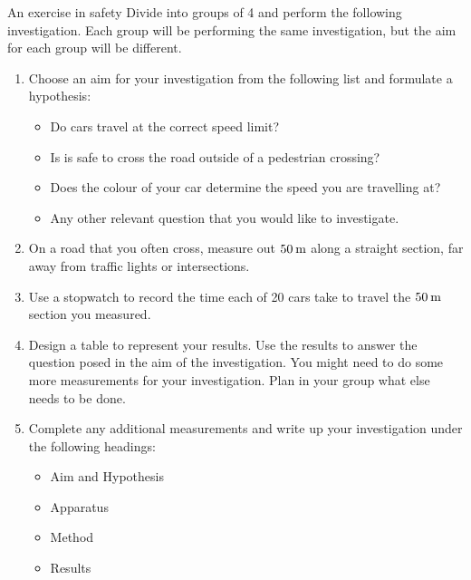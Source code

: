 \begin{Investigation}{An exercise in safety }
            \nopagebreak
        \label{m38791*id67213}Divide into groups of 4 and perform the following investigation. Each group will be performing the same investigation, but the aim for each group will be different.\par 
        \label{m38791*id67220}\begin{enumerate}[noitemsep, label=\textbf{\arabic*}. ] 
            \label{m38791*uid57}\item Choose an aim for your investigation from the following list and formulate a hypothesis:
\label{m38791*id67236}\begin{itemize}[noitemsep]
            \label{m38791*uid58}\item Do cars travel at the correct speed limit?
\label{m38791*uid59}\item Is is safe to cross the road outside of a pedestrian crossing?
\label{m38791*uid60}\item Does the colour of your car determine the speed you are travelling at?
\label{m38791*uid61}\item Any other relevant question that you would like to investigate.
\end{itemize}
        \label{m38791*uid62}\item On a road that you often cross, measure out $50\phantom{\rule{2pt}{0ex}}\text{m}$ along a straight section, far away from traffic lights or intersections.
\label{m38791*uid63}\item Use a stopwatch to record the time each of 20 cars take to travel the $50\phantom{\rule{2pt}{0ex}}\text{m}$ section you measured.
\label{m38791*uid64}\item Design a table to represent your results. Use the results to answer the question posed in the aim of the investigation. You might need to do some more measurements for your investigation. Plan in your group what else needs to be done.
\label{m38791*uid65}\item Complete any additional measurements and write up your investigation under the following headings:
\label{m38791*id67343}\begin{itemize}[noitemsep]
            \label{m38791*uid66}\item Aim and Hypothesis
\label{m38791*uid67}\item Apparatus
\label{m38791*uid68}\item Method
\label{m38791*uid69}\item Results

\end{itemize}
\end{enumerate}
\end{Investigation}
